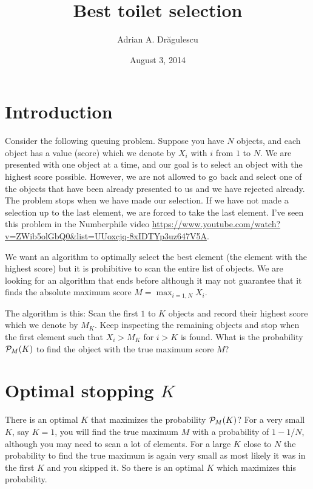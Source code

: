 \documentclass[preprint]{revtex4}
\begin{document}
\title{Best toilet selection}
\author{Adrian A. Dr\u{a}gulescu}
\date{August 3, 2014}
\maketitle



\section{Introduction}
Consider the following queuing problem.  Suppose you have $N$ objects,
and each object has a value (score) which we denote by ${X_i}$ with
$i$ from $1$ to $N$.  We are presented with one object at a time, and
our goal is to select an object with the highest score possible.
However, we are not allowed to go back and select one of the objects
that have been already presented to us and we have rejected already.
The problem stops when we have made our selection.  If we have not
made a selection up to the last element, we are forced to take the
last element.  I've seen this problem in the Numberphile video
\url{https://www.youtube.com/watch?v=ZWib5olGbQ0&list=UUoxcjq-8xIDTYp3uz647V5A}.

We want an algorithm to optimally select the best element (the element
with the highest score) but it is prohibitive to scan the entire list
of objects.  We are looking for an algorithm that ends before although
it may not guarantee that it finds the absolute maximum score $M =
\max_{i=1,N} X_i$.

The algorithm is this: Scan the first $1$ to $K$ objects and record
their highest score which we denote by $M_K$.  Keep inspecting the
remaining objects and stop when the first element such that $X_i >
M_K$ for $i>K$ is found.  What is the probability ${\cal P}_M(K)$ to
find the object with the true maximum score $M$?

\section{Optimal stopping $K$} 
 There is an optimal $K$ that maximizes the probability ${\cal
   P}_M(K)$?  For a very small $K$, say $K=1$, you will find the true
 maximum $M$ with a probability of $1-1/N$, although you may need to
 scan a lot of elements.  For a large $K$ close to $N$ the probability
 to find the true maximum is again very small as most likely it was in
 the first $K$ and you skipped it.  So there is an optimal $K$ which
 maximizes this probability.
\end{document}
